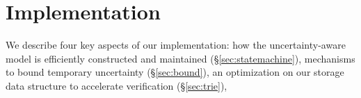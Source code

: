 \section{Implementation}
\label{sec:impl}

We describe four key aspects of our implementation:
how the uncertainty-aware model is efficiently constructed and maintained (\S\ref{sec:statemachine}), 
mechanisms to bound temporary uncertainty (\S\ref{sec:bound}),
an optimization on our storage data structure to accelerate verification (\S\ref{sec:trie}),
\fi
{}


